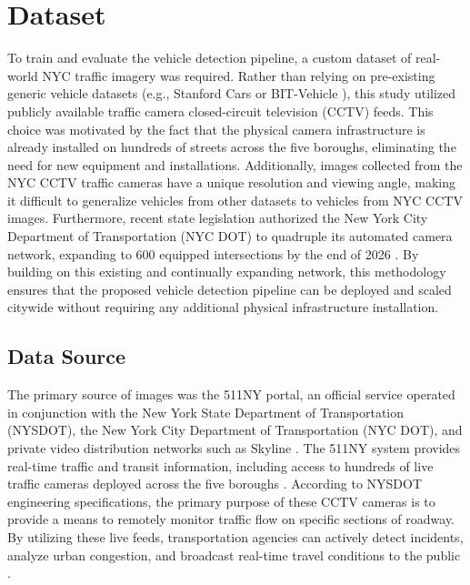 \section{Dataset}

To train and evaluate the vehicle detection pipeline, a custom dataset of real-world 
NYC traffic imagery was required. Rather than relying on pre-existing generic vehicle 
datasets (e.g., Stanford Cars \cite{Krause2013CollectingAL} or BIT-Vehicle \cite{dong_vehicle_2015}), 
this study utilized publicly available traffic camera closed-circuit television 
(CCTV) feeds. This choice was motivated by the fact that the physical camera infrastructure is already installed  
on hundreds of streets across the five boroughs, eliminating the need for new 
equipment and installations. Additionally, images collected from the NYC CCTV 
traffic cameras have a unique resolution and viewing angle, making it difficult 
to generalize vehicles from other datasets to vehicles from NYC CCTV images. 
Furthermore, recent state legislation authorized the New York City Department 
of Transportation (NYC DOT) to quadruple its automated camera network, expanding 
to 600 equipped intersections by the end of 2026 \cite{office_of_the_governor_2024}. 
By building on this existing and continually expanding network, 
this methodology ensures that the proposed vehicle detection pipeline can be 
deployed and scaled citywide without requiring any additional physical infrastructure installation.


\subsection{Data Source}

The primary source of images was the 511NY portal, an official service operated 
in conjunction with the New York State Department of Transportation (NYSDOT), 
the New York City Department of Transportation (NYC DOT), and private video 
distribution networks such as Skyline
\cite{NYCDOT_data_feeds, NYSDOT_c038145_2025, 511ny_about_rideshare}.
The 511NY system provides real-time traffic and transit information, including 
access to hundreds of live traffic cameras deployed across the five boroughs
\cite{NYCDOT_realtime}.
According to NYSDOT engineering specifications, the primary purpose of these CCTV 
cameras is to provide a means to remotely monitor traffic flow on specific sections of roadway.
By utilizing these live feeds, transportation agencies can actively detect incidents, 
analyze urban congestion, and broadcast real-time travel conditions to the public
\cite{NYCDOT_item_2024}.

